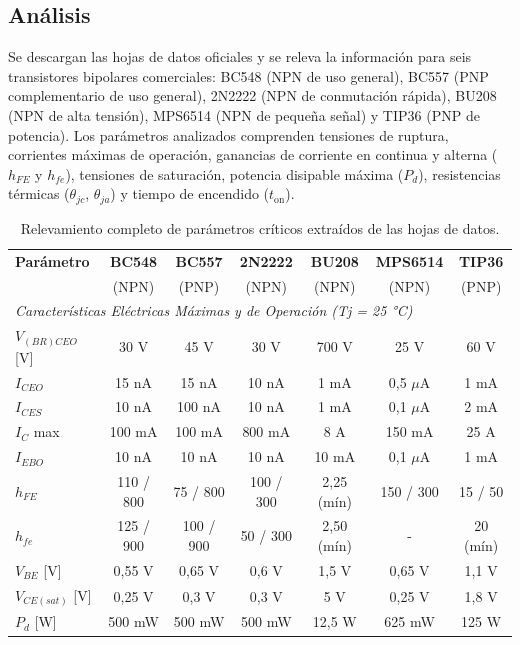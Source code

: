 \documentclass[12pt,a4paper]{article}
\newcommand{\vsample}{\addlinespace}
\begin{document}
\subsection{Análisis}
Se descargan las hojas de datos oficiales y se releva la información para seis transistores bipolares comerciales: BC548
(NPN de uso general), BC557 (PNP complementario de uso general), 2N2222 (NPN de conmutación rápida), BU208 (NPN de alta
tensión), MPS6514 (NPN de pequeña señal) y TIP36 (PNP de potencia). Los parámetros analizados comprenden tensiones de
ruptura, corrientes máximas de operación, ganancias de corriente en continua y alterna ($h_{FE}$ y $h_{fe}$), tensiones
de saturación, potencia disipable máxima ($P_d$), resistencias térmicas ($\theta_{jc}$, $\theta_{ja}$) y tiempo de
encendido ($t_{\mathrm{on}}$).

\begin{table}[H]
\centering
\small
\caption{Relevamiento completo de parámetros críticos extraídos de las hojas de datos.}
\label{tab:datasheets_bjt_completa}
\begin{tabular}{lcccccc}
\toprule
\textbf{Parámetro}  & \textbf{BC548}  & \textbf{BC557}  & \textbf{2N2222}  & \textbf{BU208}  & \textbf{MPS6514} &
    \textbf{TIP36} \\
 & (NPN) & (PNP) & (NPN) & (NPN) & (NPN) & (PNP) \\ \midrule
\multicolumn{7}{l}{\textit{Características Eléctricas Máximas y de Operación (Tj = 25 °C)}} \\ \vsample
$V_{(BR)CEO}$ [V] & 30 V & 45 V & 30 V & 700 V & 25 V & 60 V \\ \vsample
$I_{CEO}$ & 15 nA & 15 nA & 10 nA & 1 mA & 0,5 $\mu$A & 1 mA \\ \vsample
$I_{CES}$ & 10 nA & 100 nA & 10 nA & 1 mA & 0,1 $\mu$A & 2 mA \\ \vsample
$I_C$ max & 100 mA & 100 mA & 800 mA & 8 A & 150 mA & 25 A \\ \vsample
$I_{EBO}$ & 10 nA & 10 nA & 10 nA & 10 mA & 0,1 $\mu$A & 1 mA \\ \vsample
$h_{FE}$ & 110 / 800 & 75 / 800 & 100 / 300 & 2,25 (mín) & 150 / 300 & 15 / 50 \\ \vsample
$h_{fe}$ & 125 / 900 & 100 / 900 & 50 / 300 & 2,50 (mín) & - & 20 (mín) \\ \vsample
$V_{BE}$ [V] & 0,55 V & 0,65 V & 0,6 V & 1,5 V & 0,65 V & 1,1 V \\ \vsample
$V_{CE(sat)}$ [V] & 0,25 V & 0,3 V & 0,3 V & 5 V & 0,25 V & 1,8 V \\ \vsample
$P_d$ [W] & 500 mW & 500 mW & 500 mW & 12,5 W & 625 mW & 125 W \\ \midrule

\end{tabular}
\end{table}
\end{document}
